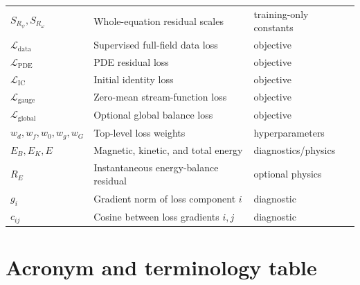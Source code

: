 \documentclass[11pt]{article}
\newcommand{\Ldata}{\mathcal{L}_{\mathrm{data}}}
\newcommand{\Lpde}{\mathcal{L}_{\mathrm{PDE}}}
\newcommand{\Lic}{\mathcal{L}_{\mathrm{IC}}}
\newcommand{\Lglobal}{\mathcal{L}_{\mathrm{global}}}
\newcommand{\Lgauge}{\mathcal{L}_{\mathrm{gauge}}}
\begin{document}
\begin{longtable}{p{}p{}p{}}
$S_{R_\psi},S_{R_\omega}$ & Whole-equation residual scales & training-only constants \\
$\Ldata$ & Supervised full-field data loss & objective \\
$\Lpde$ & PDE residual loss & objective \\
$\Lic$ & Initial identity loss & objective \\
$\Lgauge$ & Zero-mean stream-function loss & objective \\
$\Lglobal$ & Optional global balance loss & objective \\
$w_d,w_f,w_0,w_g,w_G$ & Top-level loss weights & hyperparameters \\
$E_B,E_K,E$ & Magnetic, kinetic, and total energy & diagnostics/physics \\
$R_E$ & Instantaneous energy-balance residual & optional physics \\
$g_i$ & Gradient norm of loss component $i$ & diagnostic \\
$c_{ij}$ & Cosine between loss gradients $i,j$ & diagnostic \\
\bottomrule
\end{longtable}
\normalsize

\section{Acronym and terminology table}
\label{app:acronyms}
\end{document}

